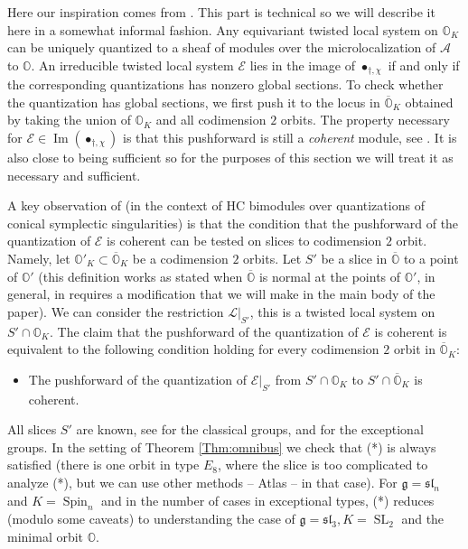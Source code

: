 \documentclass[12pt]{amsart}
\newcommand{\A}{\mathcal{A}}
\newcommand{\g}{\mathfrak{g}}
\newcommand{\Orb}{\mathbb{O}}
\theoremstyle{definition}
\numberwithin{equation}{section}
\begin{document}
Here our inspiration comes from \cite{HC_symp}. This part is technical so we will describe
it here in a somewhat informal fashion. Any equivariant twisted local system
on $\Orb_K$ can be uniquely quantized to a sheaf of modules over the microlocalization of
$\A$ to $\Orb$. An irreducible twisted local system $\mathcal{E}$
lies in the image of $\bullet_{\dagger,\chi}$
if and only if the corresponding quantizations has nonzero global sections. To check whether
the quantization has global sections, we first push it to the locus in $\overline{\Orb}_K$
obtained by taking the union of $\Orb_K$ and all codimension $2$ orbits. The property
necessary for $\mathcal{E}\in \operatorname{Im}(\bullet_{\dagger,\chi})$ is that this
pushforward is still a {\it coherent} module, see \cite[Section 2.5]{HC_symp}. It is also close to being sufficient so for the purposes
of this section we will treat it as necessary and sufficient.

A key observation of \cite{HC_symp} (in the context of HC bimodules over quantizations of
conical symplectic singularities)  is that the condition that the pushforward of the quantization of
$\mathcal{E}$ is coherent can be tested on slices to codimension $2$ orbit. Namely, let $\Orb'_K\subset \overline{\Orb}_K$ be a codimension $2$ orbits. Let $S'$ be a slice in $\overline{\Orb}$ to a point of $\Orb'$ (this definition works as stated when $\overline{\Orb}$
is normal at the points of $\Orb'$, in general, in requires a modification that we will make in the main body of the paper). 
We can consider the restriction $\mathcal{L}|_{S'}$, this is a twisted local system
on $S'\cap \Orb_K$. The claim that the pushforward of the quantization of $\mathcal{E}$ is coherent
is equivalent to the following condition holding for every codimension
$2$ orbit in $\overline{\Orb}_K$:
\begin{itemize}
\item[(*)] The pushforward of the quantization of $\mathcal{E}|_{S'}$
from $S'\cap \Orb_K$ to $S'\cap \overline{\Orb}_K$ is coherent.
\end{itemize}
All slices $S'$ are known, see \cite{KP1,KP2} for the classical groups, and \cite{FJLS1} for
the exceptional groups. In the setting of Theorem  \ref{Thm:omnibus} we check that (*) is always
satisfied (there is one orbit in type $E_8$, where the slice is too complicated to analyze (*), but
we can use other methods -- Atlas -- in that case). For $\g=\mathfrak{sl}_n$ and $K=\operatorname{Spin}_n$
and in the number of cases in exceptional types, (*) reduces (modulo some caveats)
to understanding the case of $\g=\mathfrak{sl}_3, K=\operatorname{SL}_2$ and the minimal orbit $\Orb$.
\end{document}
